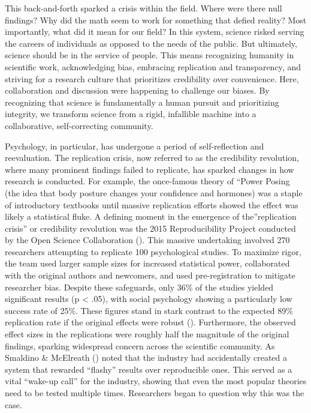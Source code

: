 \documentclass[
  letterpaper,
]{book}
\begin{document}
This back-and-forth sparked a crisis within the field. Where were there
null findings? Why did the math seem to work for something that defied
reality? Most importantly, what did it mean for our field? In this
system, science risked serving the careers of individuals as opposed to
the needs of the public. But ultimately, science should be in the
service of people. This means recognizing humanity in scientific work,
acknowledging bias, embracing replication and transparency, and striving
for a research culture that prioritizes credibility over convenience.
Here, collaboration and discussion were happening to challenge our
biases. By recognizing that science is fundamentally a human pursuit and
prioritizing integrity, we transform science from a rigid, infallible
machine into a collaborative, self-correcting community.

Psychology, in particular, has undergone a period of self-reflection and
reevaluation. The replication crisis, now referred to as the credibility
revolution, where many prominent findings failed to replicate, has
sparked changes in how research is conducted. For example, the
once-famous theory of ``Power Posing (the idea that body posture changes
your confidence and hormones) was a staple of introductory textbooks
until massive replication efforts showed the effect was likely a
statistical fluke. A defining moment in the emergence of
the''replication crisis'' or credibility revolution was the 2015
Reproducibility Project conducted by the Open Science Collaboration
(). This
massive undertaking involved 270 researchers attempting to replicate 100
psychological studies. To maximize rigor, the team used larger sample
sizes for increased statistical power, collaborated with the original
authors and newcomers, and used pre-registration to mitigate researcher
bias. Despite these safeguards, only 36\% of the studies yielded
significant results (p \textless{} .05), with social psychology showing
a particularly low success rate of 25\%. These figures stand in stark
contrast to the expected 89\% replication rate if the original effects
were robust ().
Furthermore, the observed effect sizes in the replications were roughly
half the magnitude of the original findings, sparking widespread concern
across the scientific community. As Smaldino \& McElreath
() noted that the industry had
accidentally created a system that rewarded ``flashy'' results over
reproducible ones. This served as a vital ``wake-up call'' for the
industry, showing that even the most popular theories need to be tested
multiple times. Researchers began to question why this was the case.
\end{document}
